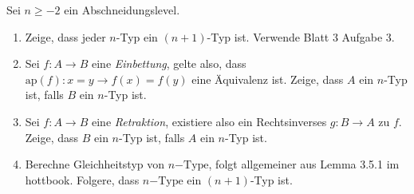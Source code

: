 \documentclass{uebung}
\begin{document}
\begin{exercise}
  Sei $n\geq -2$ ein Abschneidungslevel.
  \begin{enumerate}
    \item Zeige, dass jeder $n$-Typ ein $(n+1)$-Typ ist. {\tiny Verwende Blatt 3 Aufgabe 3.}
    \item Sei $f:A \to B$ eine \emph{Einbettung}, gelte also, dass $\mathrm{ap}(f) : x=y \to f(x)=f(y)$ eine Äquivalenz ist.
      Zeige, dass $A$ ein $n$-Typ ist, falls $B$ ein $n$-Typ ist.
    \item Sei $f:A \to B$ eine \emph{Retraktion}, existiere also ein Rechtsinverses $g:B\to A$ zu $f$.
      Zeige, dass $B$ ein $n$-Typ ist, falls $A$ ein $n$-Typ ist.
    \item Berechne Gleichheitstyp von $n\mathrm{-Type}$, folgt allgemeiner aus Lemma 3.5.1 im hottbook.
      Folgere, dass $n\mathrm{-Type}$ ein $(n+1)$-Typ ist.
  \end{enumerate}
\end{exercise}
\end{document}
